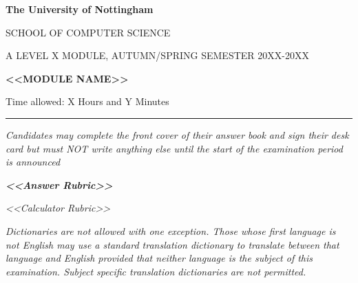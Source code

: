 \documentclass[11pt,a4paper,twoside]{article}
\begin{document}
\begin{center}\begin{LARGE}\textbf{The University of Nottingham}\end{LARGE}\end{center}

\begin{center}SCHOOL OF COMPUTER SCIENCE\end{center}

\begin{center}A LEVEL X MODULE, AUTUMN/SPRING 
SEMESTER 20XX-20XX\end{center}

\begin{center}\textbf{<<MODULE NAME>>}\end{center}

\begin{center}Time allowed: X Hours and Y Minutes\end{center}

\begin{center}\rule{\textwidth}{0.4pt}\end{center}

\begin{center}\textit{Candidates may complete the front cover of their answer book and sign their desk card but must NOT write anything else until the start of the examination period is announced}\end{center}


\begin{center}\textbf{\textit{<<Answer Rubric>>}
}\end{center}

\begin{center}\textit{\textit{<<Calculator Rubric>>}}\end{center}

\begin{center}\textit{Dictionaries are not allowed with one exception. Those whose first language is not English may use a standard translation dictionary to translate between that language and English provided that neither language is the subject of this examination. Subject specific translation dictionaries are not permitted.}\end{center}
\end{document}
